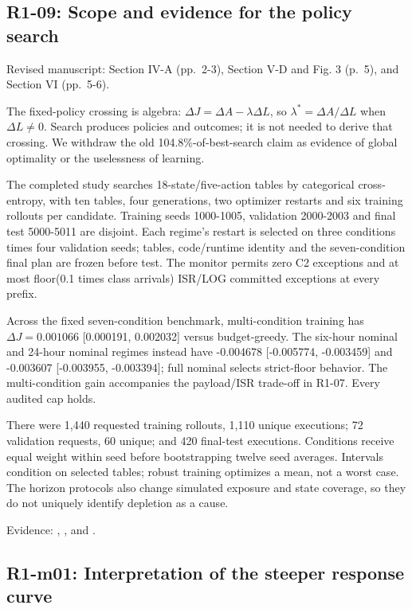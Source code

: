 \subsection{R1-09: Scope and evidence for the policy search}\label{r1-09-scope-and-evidence-for-the-policy-search}

Revised manuscript: Section IV-A (pp.~2-3), Section V-D and Fig. 3 (p.~5), and Section VI (pp.~5-6).

The fixed-policy crossing is algebra: \(\Delta J=\Delta A-\lambda\Delta L\), so \(\lambda^\ast=\Delta A/\Delta L\) when \(\Delta L\ne0\). Search produces policies and outcomes; it is not needed to derive that crossing. We withdraw the old 104.8\%-of-best-search claim as evidence of global optimality or the uselessness of learning.

The completed study searches 18-state/five-action tables by categorical cross-entropy, with ten tables, four generations, two optimizer restarts and six training rollouts per candidate. Training seeds 1000-1005, validation 2000-2003 and final test 5000-5011 are disjoint. Each regime's restart is selected on three conditions times four validation seeds; tables, code/runtime identity and the seven-condition final plan are frozen before test. The monitor permits zero C2 exceptions and at most floor(0.1 times class arrivals) ISR/LOG committed exceptions at every prefix.

Across the fixed seven-condition benchmark, multi-condition training has \(\Delta J=0.001066\) {[}0.000191, 0.002032{]} versus budget-greedy. The six-hour nominal and 24-hour nominal regimes instead have -0.004678 {[}-0.005774, -0.003459{]} and -0.003607 {[}-0.003955, -0.003394{]}; full nominal selects strict-floor behavior. The multi-condition gain accompanies the payload/ISR trade-off in R1-07. Every audited cap holds.

There were 1,440 requested training rollouts, 1,110 unique executions; 72 validation requests, 60 unique; and 420 final-test executions. Conditions receive equal weight within seed before bootstrapping twelve seed averages. Intervals condition on selected tables; robust training optimizes a mean, not a worst case. The horizon protocols also change simulated exposure and state coverage, so they do not uniquely identify depletion as a cause.

Evidence: , , and .

\subsection{R1-m01: Interpretation of the steeper response curve}\label{r1-m01-interpretation-of-the-steeper-response-curve}

